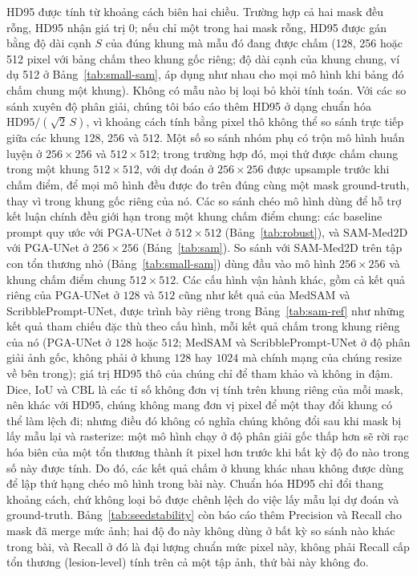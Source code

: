 \documentclass[11pt]{article}
\begin{document}
HD95 được tính từ khoảng cách biên hai chiều. Trường hợp cả hai mask đều rỗng, HD95 nhận giá trị 0; nếu chỉ một trong hai mask rỗng, HD95 được gán bằng độ dài cạnh $S$ của đúng khung mà mẫu đó đang được chấm (128, 256 hoặc 512 pixel với bảng chấm theo khung gốc riêng; độ dài cạnh của khung chung, ví dụ 512 ở Bảng~\ref{tab:small-sam}, áp dụng như nhau cho mọi mô hình khi bảng đó chấm chung một khung). Không có mẫu nào bị loại bỏ khỏi tính toán. Với các so sánh xuyên độ phân giải, chúng tôi báo cáo thêm HD95 ở dạng chuẩn hóa $\mathrm{HD95}/(\sqrt{2}\,S)$, vì khoảng cách tính bằng pixel thô không thể so sánh trực tiếp giữa các khung $128$, $256$ và $512$. Một số so sánh nhóm phụ có trộn mô hình huấn luyện ở $256\times256$ và $512\times512$; trong trường hợp đó, mọi thứ được chấm chung trong một khung $512\times512$, với dự đoán ở $256\times256$ được upsample trước khi chấm điểm, để mọi mô hình đều được đo trên đúng cùng một mask ground-truth, thay vì trong khung gốc riêng của nó. Các so sánh chéo mô hình dùng để hỗ trợ kết luận chính đều giới hạn trong một khung chấm điểm chung: các baseline prompt quy ước với PGA-UNet ở $512\times512$ (Bảng~\ref{tab:robust}), và SAM-Med2D với PGA-UNet ở $256\times256$ (Bảng~\ref{tab:sam}). So sánh với SAM-Med2D trên tập con tổn thương nhỏ (Bảng~\ref{tab:small-sam}) dùng đầu vào mô hình $256\times256$ và khung chấm điểm chung $512\times512$. Các cấu hình vận hành khác, gồm cả kết quả riêng của PGA-UNet ở $128$ và $512$ cũng như kết quả của MedSAM và ScribblePrompt-UNet, được trình bày riêng trong Bảng~\ref{tab:sam-ref} như những kết quả tham chiếu đặc thù theo cấu hình, mỗi kết quả chấm trong khung riêng của nó (PGA-UNet ở $128$ hoặc $512$; MedSAM và ScribblePrompt-UNet ở độ phân giải ảnh gốc, không phải ở khung $128$ hay $1024$ mà chính mạng của chúng resize về bên trong); giá trị HD95 thô của chúng chỉ để tham khảo và không in đậm. Dice, IoU và CBL là các tỉ số không đơn vị tính trên khung riêng của mỗi mask, nên khác với HD95, chúng không mang đơn vị pixel để một thay đổi khung có thể làm lệch đi; nhưng điều đó không có nghĩa chúng không đổi sau khi mask bị lấy mẫu lại và rasterize: một mô hình chạy ở độ phân giải gốc thấp hơn sẽ rời rạc hóa biên của một tổn thương thành ít pixel hơn trước khi bất kỳ độ đo nào trong số này được tính. Do đó, các kết quả chấm ở khung khác nhau không được dùng để lập thứ hạng chéo mô hình trong bài này. Chuẩn hóa HD95 chỉ đổi thang khoảng cách, chứ không loại bỏ được chênh lệch do việc lấy mẫu lại dự đoán và ground-truth. Bảng~\ref{tab:seedstability} còn báo cáo thêm Precision và Recall cho mask đã merge mức ảnh; hai độ đo này không dùng ở bất kỳ so sánh nào khác trong bài, và Recall ở đó là đại lượng chuẩn mức pixel này, không phải Recall cấp tổn thương (lesion-level) tính trên cả một tập ảnh, thứ bài này không đo.
\end{document}
